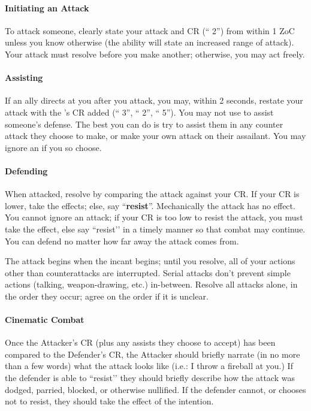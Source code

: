 \documentclass[sheet]{GL2020}
\begin{document}
\paragraph{Initiating an Attack} To attack someone, clearly state your attack and CR (``\aKnockOut{} 2'') from within 1 ZoC unless you know otherwise (the ability will state an increased range of attack). Your attack must resolve before you make another; otherwise, you may act freely. 

\paragraph{Assisting} If an ally directs {\bf \aAssist{}} at you after you attack, you may, within 2 seconds, restate your attack with the \aAssist{}'s CR added (``\aKnockOut{} 3'', ``\aAssist{} 2'', ``\aKnockOut{} 5''). You may not use \aAssist{} to assist someone’s defense. The best you can do is try to assist them in any counter attack they choose to make, or make your own attack on their assailant. You may ignore an \aAssist{} if you so choose.

\paragraph{Defending} When attacked, resolve by comparing the attack against your CR.  If your CR is lower, take the effects; else, say ``{\bf resist}''. Mechanically the attack has no effect. You cannot ignore an attack; if your CR is too low to resist the attack, you must take the effect, else say ``resist’’ in a timely manner so that combat may continue. You can defend no matter how far away the attack comes from.

The attack begins when the incant begins; until you resolve, all of your actions other than counterattacks are interrupted. Serial attacks don't prevent simple actions (talking, weapon-drawing, etc.) in-between. Resolve all attacks alone, in the order they occur; agree on the order if it is unclear.

\paragraph{Cinematic Combat} Once the Attacker’s CR (plus any assists they choose to accept) has been compared to the Defender’s CR, the Attacker should briefly narrate (in no more than a few words) what the attack looks like (i.e.: I throw a fireball at you.) If the defender is able to ``resist’’ they should briefly describe how the attack was dodged, parried, blocked, or otherwise nullified. If the defender cannot, or chooses not to resist, they should take the effect of the intention.
\end{document}
